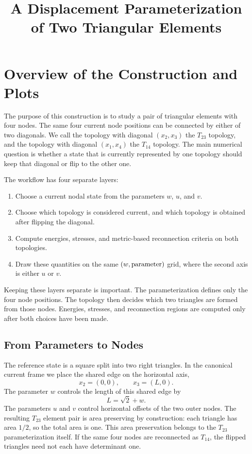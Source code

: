 \documentclass[11pt]{article}
\title{A Displacement Parameterization of Two Triangular Elements}
\author{}
\date{}
\begin{document}
\maketitle

\section{Overview of the Construction and Plots}

The purpose of this construction is to study a pair of triangular elements
with four nodes. The same four current node positions can be connected by
either of two diagonals. We call the topology with diagonal \((x_2,x_3)\)
the \(T_{23}\) topology, and the topology with diagonal \((x_1,x_4)\) the
\(T_{14}\) topology. The main numerical question is whether a state that is
currently represented by one topology should keep that diagonal or flip to
the other one.

The workflow has four separate layers:
\begin{enumerate}
    \item Choose a current nodal state from the parameters \(w\), \(u\), and
          \(v\).
    \item Choose which topology is considered current, and which topology is
          obtained after flipping the diagonal.
    \item Compute energies, stresses, and metric-based reconnection criteria
          on both topologies.
    \item Draw these quantities on the same \((w,\hbox{parameter})\) grid,
          where the second axis is either \(u\) or \(v\).
\end{enumerate}
Keeping these layers separate is important. The parameterization defines only
the four node positions. The topology then decides which two triangles are
formed from those nodes. Energies, stresses, and reconnection regions are
computed only after both choices have been made.

\subsection{From Parameters to Nodes}

The reference state is a square split into two right triangles. In the
canonical current frame we place the shared edge on the horizontal axis,
\[
    x_2=(0,0), \qquad x_3=(L,0).
\]
The parameter \(w\) controls the length of this shared edge by
\[
    L=\sqrt{2}+w.
\]
The parameters \(u\) and \(v\) control horizontal offsets of the two outer
nodes. The resulting \(T_{23}\) element pair is area preserving by
construction: each triangle has area \(1/2\), so the total area is one.
This area preservation belongs to the \(T_{23}\) parameterization itself. If
the same four nodes are reconnected as \(T_{14}\), the flipped triangles need
not each have determinant one.
\end{document}
